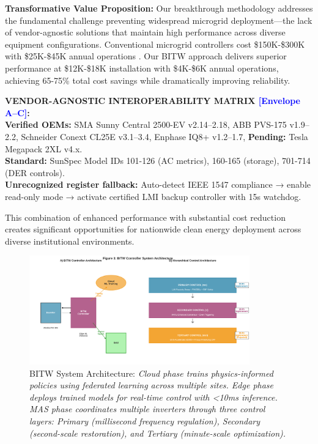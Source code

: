\documentclass[12pt]{article}
\begin{document}
\textbf{Transformative Value Proposition:} Our breakthrough methodology addresses the fundamental challenge preventing widespread microgrid deployment---the lack of vendor-agnostic solutions that maintain high performance across diverse equipment configurations. Conventional microgrid controllers cost \$150K-\$300K with \$25K-\$45K annual operations \cite{hirsch2018,sigrin2019}. Our BITW approach delivers superior performance at \$12K-\$18K installation with \$4K-\$6K annual operations, achieving 65-75\% total cost savings while dramatically improving reliability.

\begin{center}
\colorbox{green!20}{\begin{minipage}{0.95\textwidth}
\textbf{VENDOR-AGNOSTIC INTEROPERABILITY MATRIX \textcolor{blue}{[Envelope A--C]}:} \\
\textbf{Verified OEMs:} SMA Sunny Central 2500-EV v2.14--2.18, ABB PVS-175 v1.9--2.2, Schneider Conext CL25E v3.1--3.4, Enphase IQ8+ v1.2--1.7, \textbf{Pending:} Tesla Megapack 2XL v4.x. \\
\textbf{Standard:} SunSpec Model IDs 101-126 (AC metrics), 160-165 (storage), 701-714 (DER controls). \\
\textbf{Unrecognized register fallback:} Auto-detect IEEE 1547 compliance → enable read-only mode → activate certified LMI backup controller with 15s watchdog.
\end{minipage}}
\end{center}

This combination of enhanced performance with substantial cost reduction creates significant opportunities for nationwide clean energy deployment across diverse institutional environments.

\begin{figure}[H]
\centering
\includegraphics[width=0.85\textwidth]{figure3_system_architecture.pdf}
\caption{BITW System Architecture: \textit{Cloud phase trains physics-informed policies using federated learning across multiple sites. Edge phase deploys trained models for real-time control with <10ms inference. MAS phase coordinates multiple inverters through three control layers: Primary (millisecond frequency regulation), Secondary (second-scale restoration), and Tertiary (minute-scale optimization).}}
\end{figure}
\end{document}
